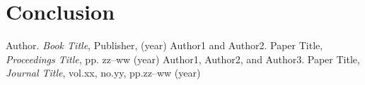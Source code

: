 \documentclass[12pt,a4paper]{report}
\begin{document}
\chapter{Conclusion}
%

\begin{thebibliography}{99}
 Author. \textit{Book Title}, Publisher, (year)
 Author1 and Author2. Paper Title, \textit{Proceedings Title}, pp. zz--ww (year)
 Author1, Author2, and Author3. Paper Title, \textit{Journal Title}, vol.xx, no.yy, pp.zz--ww (year)
\end{thebibliography}
\end{document}
